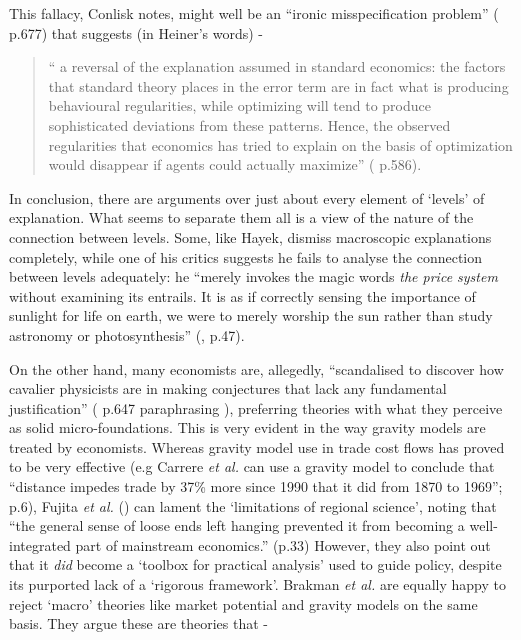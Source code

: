 This fallacy, Conlisk notes, might well be an ``ironic misspecification problem'' (\citealt{conlisk_why_1996} p.677)  that suggests (in Heiner's words) -

\begin{quote}
`` a reversal of the explanation assumed in standard economics: the factors that standard theory places in the error term are in fact what is producing behavioural regularities, while optimizing will tend to produce sophisticated deviations from these patterns. Hence, the observed regularities that economics has tried to explain on the basis of optimization would disappear if agents could actually maximize'' (\citealt{heiner_origin_1983} p.586).
\end{quote}

In conclusion, there are arguments over just about every element of `levels' of explanation. What seems to separate them all is a view of the nature of the connection between levels. Some, like Hayek, dismiss macroscopic explanations completely, while one of his critics suggests he fails to analyse the connection between levels adequately: he ``merely invokes the magic words \emph{the price system} without examining its entrails. It is as if correctly sensing the importance of sunlight for life on earth, we were to merely worship the sun rather than study astronomy or photosynthesis” (\citealt{birner_equilibrium_1994}, p.47). 

On the other hand, many economists are, allegedly, ``scandalised to discover how cavalier physicists are in making conjectures that lack any fundamental justification'' (\citealt{ball_social_2007} p.647 paraphrasing \citealt{miller_complex_2007}), preferring theories with what they perceive as solid micro-foundations. This is very evident in the way gravity models are treated by economists. Whereas gravity model use in trade cost flows has proved to be very effective (e.g Carrere \emph{et al.} can use a gravity model to conclude that ``distance impedes trade by 37\% more since 1990 that it did from 1870 to 1969''; \citealt{carrere_distance_2009} p.6), Fujita \emph{et al.} (\citeyear{fujita_spatial_2001}) can lament the `limitations of regional science', noting that ``the general sense of loose ends left hanging prevented it from becoming a well-integrated part of mainstream economics.'' (p.33) However, they also point out that it \emph{did} become a `toolbox for practical analysis' used to guide policy, despite its purported lack of a `rigorous framework'. Brakman \emph{et al.} are equally happy to reject `macro' theories like market potential and gravity models on the same basis. They argue these are theories that -

